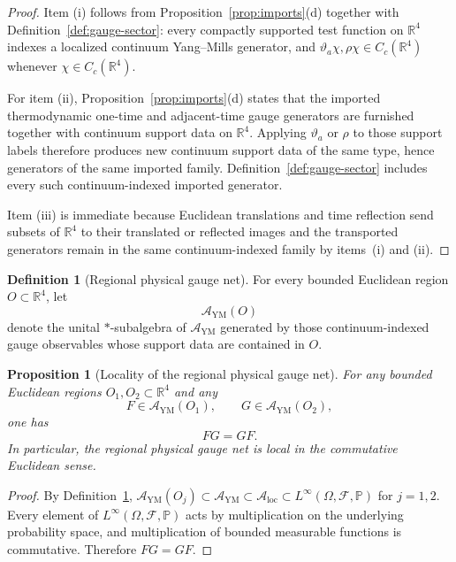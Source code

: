 \documentclass[11pt]{article}
\newtheorem{proposition}[theorem]{Proposition}
\theoremstyle{definition}
\newtheorem{definition}[theorem]{Definition}
\theoremstyle{remark}
\newcommand{\R}{\mathbb R}
\newcommand{\mcA}{\mathcal A}
\newcommand{\mcF}{\mathcal F}
\begin{document}
\begin{proof}
Item \textnormal{(i)} follows from
Proposition~\ref{prop:imports}\textnormal{(d)} together with
Definition~\ref{def:gauge-sector}: every compactly supported test function on
\(\R^4\) indexes a localized continuum Yang--Mills generator, and
\(\vartheta_a\chi,\rho\chi\in C_c(\R^4)\) whenever \(\chi\in C_c(\R^4)\).

For item \textnormal{(ii)}, Proposition~\ref{prop:imports}\textnormal{(d)}
states that the imported thermodynamic one-time and adjacent-time gauge
generators are furnished together with continuum support data on \(\R^4\).
Applying \(\vartheta_a\) or \(\rho\) to those support labels therefore produces
new continuum support data of the same type, hence generators of the same
imported family.  Definition~\ref{def:gauge-sector} includes every such
continuum-indexed imported generator.

Item \textnormal{(iii)} is immediate because Euclidean translations and time
reflection send subsets of \(\R^4\) to their translated or reflected images and
the transported generators remain in the same continuum-indexed family by
items~\textnormal{(i)} and \textnormal{(ii)}.
\end{proof}

\begin{definition}[Regional physical gauge net]
\label{def:regional-gauge-net}
For every bounded Euclidean region \(O\subset\R^4\), let
\[
\mcA_{\mathrm{YM}}(O)
\]
denote the unital \( * \)-subalgebra of \(\mcA_{\mathrm{YM}}\) generated by
those continuum-indexed gauge observables whose support data are contained in
\(O\).
\end{definition}

\begin{proposition}[Locality of the regional physical gauge net]
\label{prop:regional-locality}
For any bounded Euclidean regions \(O_1,O_2\subset\R^4\) and any
\[
F\in\mcA_{\mathrm{YM}}(O_1),\qquad G\in\mcA_{\mathrm{YM}}(O_2),
\]
one has
\[
FG=GF.
\]
In particular, the regional physical gauge net is local in the commutative
Euclidean sense.
\end{proposition}

\begin{proof}
By Definition~\ref{def:regional-gauge-net},
\(\mcA_{\mathrm{YM}}(O_j)\subset\mcA_{\mathrm{YM}}\subset\mcA_{\mathrm{loc}}
\subset L^\infty(\Omega,\mcF,\mathbb P)\) for \(j=1,2\).  Every element of
\(L^\infty(\Omega,\mcF,\mathbb P)\) acts by multiplication on the underlying
probability space, and multiplication of bounded measurable functions is
commutative.  Therefore \(FG=GF\).
\end{proof}
\end{document}
